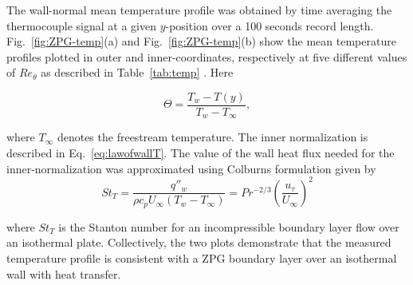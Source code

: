 \begin{table}[h]
\caption{Parameters for measured temperature profiles}
\centering
{}
\label{tab:temp}
\end{table}
The wall-normal mean temperature profile was obtained by time averaging the thermocouple signal at a given $y$-position over a 100 seconds record length. Fig.~\ref{fig:ZPG-temp}(a) and Fig.~\ref{fig:ZPG-temp}(b) show the mean temperature profiles plotted in outer and inner-coordinates, respectively at five different values of $Re_\theta$ as described in Table~\ref{tab:temp} . Here 

\begin{equation}
\Theta = \frac{T_w - T(y)}{T_w - T_\infty},
\end{equation}

\noindent where $T_\infty$ denotes the freestream temperature. The inner normalization is described in Eq.~\ref{eq:lawofwallT}. The value of the wall heat flux needed for the inner-normalization was approximated using Colburns formulation given by 
\begin{equation}
St_T = \frac{q''_w}{\rho c_p U_\infty (T_{w} - T_\infty)} = Pr^{-2/3} \left(\frac{u_\tau}{U_\infty}\right)^2 
\label{eq:qw}
\end{equation}

\noindent where $St_T$ is the Stanton number for an incompressible boundary layer flow over an isothermal plate. Collectively, the two plots demonstrate that the measured temperature profile is consistent with a ZPG boundary layer over an isothermal wall with heat transfer.  

